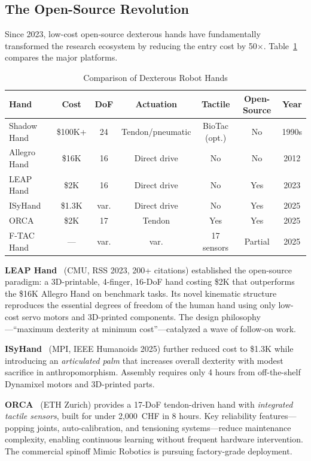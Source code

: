 \subsection{The Open-Source Revolution}

Since 2023, low-cost open-source dexterous hands have fundamentally transformed the research ecosystem by reducing the entry cost by 50$\times$. Table~\ref{tab:hands} compares the major platforms.

\begin{table}[t]
\caption{Comparison of Dexterous Robot Hands}
\label{tab:hands}
\centering
\begin{tabular}{@{}lcccccc@{}}
\toprule
\textbf{Hand} & \textbf{Cost} & \textbf{DoF} & \textbf{Actuation} & \textbf{Tactile} & \textbf{Open-Source} & \textbf{Year} \\
\midrule
Shadow Hand & \$100K+ & 24 & Tendon/pneumatic & BioTac (opt.) & No & 1990s \\
Allegro Hand & \$16K & 16 & Direct drive & No & No & 2012 \\
LEAP Hand~\cite{shaw2023leap} & \$2K & 16 & Direct drive & No & Yes & 2023 \\
ISyHand~\cite{richardson2025isyhand} & \$1.3K & var. & Direct drive & No & Yes & 2025 \\
ORCA~\cite{christoph2025orca} & \$2K & 17 & Tendon & Yes & Yes & 2025 \\
F-TAC Hand~\cite{zhao2025ftac} & --- & var. & var. & 17 sensors & Partial & 2025 \\
\bottomrule
\end{tabular}
\end{table}

\textbf{LEAP Hand}~\cite{shaw2023leap} (CMU, RSS 2023, 200+ citations) established the open-source paradigm: a 3D-printable, 4-finger, 16-DoF hand costing \$2K that outperforms the \$16K Allegro Hand on benchmark tasks. Its novel kinematic structure reproduces the essential degrees of freedom of the human hand using only low-cost servo motors and 3D-printed components. The design philosophy---``maximum dexterity at minimum cost''---catalyzed a wave of follow-on work.

\textbf{ISyHand}~\cite{richardson2025isyhand} (MPI, IEEE Humanoids 2025) further reduced cost to \$1.3K while introducing an \emph{articulated palm} that increases overall dexterity with modest sacrifice in anthropomorphism. Assembly requires only 4 hours from off-the-shelf Dynamixel motors and 3D-printed parts.

\textbf{ORCA}~\cite{christoph2025orca} (ETH Zurich) provides a 17-DoF tendon-driven hand with \emph{integrated tactile sensors}, built for under 2{,}000~CHF in 8 hours. Key reliability features---popping joints, auto-calibration, and tensioning systems---reduce maintenance complexity, enabling continuous learning without frequent hardware intervention. The commercial spinoff Mimic Robotics is pursuing factory-grade deployment.

